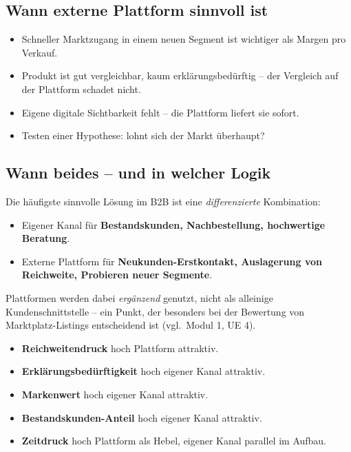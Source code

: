 \documentclass[11pt,a4paper,oneside]{article}
\begin{document}
\subsection{Wann externe Plattform sinnvoll ist}

\begin{itemize}
  \item Schneller Marktzugang in einem neuen Segment ist wichtiger als Margen pro Verkauf.
  \item Produkt ist gut vergleichbar, kaum erklärungsbedürftig -- der Vergleich auf der Plattform schadet nicht.
  \item Eigene digitale Sichtbarkeit fehlt -- die Plattform liefert sie sofort.
  \item Testen einer Hypothese: lohnt sich der Markt überhaupt?
\end{itemize}

\subsection{Wann beides -- und in welcher Logik}

Die häufigste sinnvolle Lösung im B2B ist eine \emph{differenzierte} Kombination:

\begin{itemize}
  \item Eigener Kanal für \textbf{Bestandskunden, Nachbestellung, hochwertige Beratung}.
  \item Externe Plattform für \textbf{Neukunden-Erstkontakt, Auslagerung von Reichweite, Probieren neuer Segmente}.
\end{itemize}

Plattformen werden dabei \emph{ergänzend} genutzt, nicht als alleinige Kundenschnittstelle -- ein Punkt, der besonders bei der Bewertung von Marktplatz-Listings entscheidend ist (vgl.\ Modul 1, UE 4).

\begin{merkbox}
\begin{itemize}
  \item \textbf{Reichweitendruck} hoch \textrightarrow{} Plattform attraktiv.
  \item \textbf{Erklärungsbedürftigkeit} hoch \textrightarrow{} eigener Kanal attraktiv.
  \item \textbf{Markenwert} hoch \textrightarrow{} eigener Kanal attraktiv.
  \item \textbf{Bestandskunden-Anteil} hoch \textrightarrow{} eigener Kanal attraktiv.
  \item \textbf{Zeitdruck} hoch \textrightarrow{} Plattform als Hebel, eigener Kanal parallel im Aufbau.
\end{itemize}
\end{merkbox}
\end{document}
